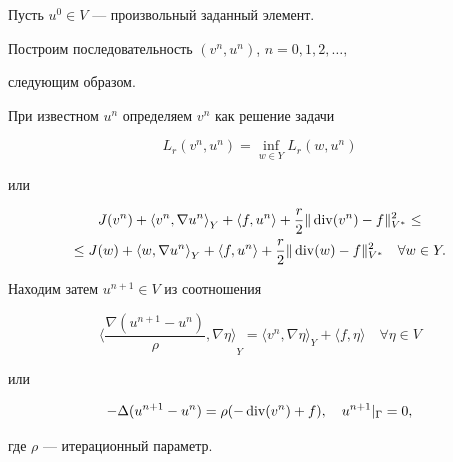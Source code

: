 Пусть $u^{0} \in V$ --- произвольный заданный элемент.


 


Построим последовательность $(v^{n},u^{n})$, $n = 0,1,2,\dotsc,$


следующим образом.


 


При известном $u^{n}$ определяем $v^{n}$ как решение задачи


$$


L_{r}(v^{n},u^{n}) = \inf_{w \in Y } L_{r}(w,u^{n})


$$


или


\begin{multline}


J(v^{n}) + {\langle v^{n},\nabla u^{n} \rangle}_{Y} + 


{\langle f,u^{n} \rangle} 


+ \frac{r}{2} \|\Div (v^{n}) - f \|^{2}_{V^{*}} \le \\


\le J(w) + {\langle w,\nabla u^{n} \rangle}_{Y} + 


{\langle f,u^{n} \rangle} + \frac{r}{2} 


\|\Div(w) - f\|^{2}_{V^{*}} \quad \forall w \in Y.


\end{multline}


 


Находим затем $u^{n+1} \in V$ из соотношения


\begin{equation}


{\Big\langle \frac {\nabla (u^{n+1} - u^{n})} {\rho } ,\nabla \eta \Big\rangle} 


_{Y}= {\langle v^{n},\nabla \eta \rangle}_{Y} + {\langle f,\eta \rangle} 


\quad \forall \eta \in V


\end{equation}


или


\begin{equation}


-\Delta(u^{n+1}-u^{n})=\rho(-\Div(v^{n})+f),\quad u^{n+1}|_{\Gamma} = 0,


\end{equation}


где $\rho $ --- итерационный параметр.


